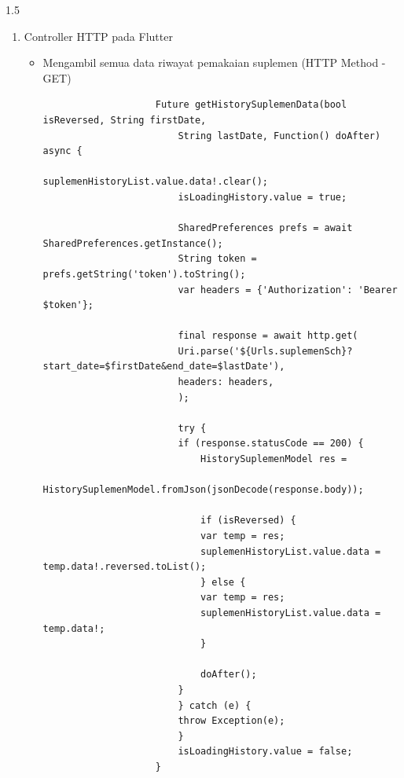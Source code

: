 \begin{spacing}{1.5}
\begin{enumerate}
\begin{enumerate}
\begin{itemize}
\begin{lstlisting}
								theDate = request.form.get('created_at', None)
					
								body = {
									"farm_id": farm,
									"fish_suplemen_id": request.form.get('fish_suplemen_id', None),
									"original_amount": request.form.get('original_amount', None),
									"usage": request.form.get('usage', None),
									"pond": request.form.get('pond', None),
								}
					
								if theDate != '':
									body['created_at'] = datetime.datetime.strptime(theDate, "%Y-%m-%dT%H:%M:%S.%f %z") 

							except Exception as e:
								response = {"message": str(e)}
								response = json.dumps(response, default=str)
								return Response(response, mimetype="application/json", status=400)
				\end{lstlisting}
			\end{itemize}

			\item Controller HTTP pada Flutter
			
			\begin{itemize}
				\item Mengambil semua data riwayat pemakaian suplemen (HTTP Method - GET)
				
				\begin{lstlisting}
					Future getHistorySuplemenData(bool isReversed, String firstDate,
						String lastDate, Function() doAfter) async {
						suplemenHistoryList.value.data!.clear();
						isLoadingHistory.value = true;

						SharedPreferences prefs = await SharedPreferences.getInstance();
						String token = prefs.getString('token').toString();
						var headers = {'Authorization': 'Bearer $token'};

						final response = await http.get(
						Uri.parse('${Urls.suplemenSch}?start_date=$firstDate&end_date=$lastDate'),
						headers: headers,
						);

						try {
						if (response.statusCode == 200) {
							HistorySuplemenModel res =
								HistorySuplemenModel.fromJson(jsonDecode(response.body));

							if (isReversed) {
							var temp = res;
							suplemenHistoryList.value.data = temp.data!.reversed.toList();
							} else {
							var temp = res;
							suplemenHistoryList.value.data = temp.data!;
							}

							doAfter();
						}
						} catch (e) {
						throw Exception(e);
						}
						isLoadingHistory.value = false;
					}
				\end{lstlisting}


\end{itemize}
\end{enumerate}
\end{enumerate}
\end{spacing}
